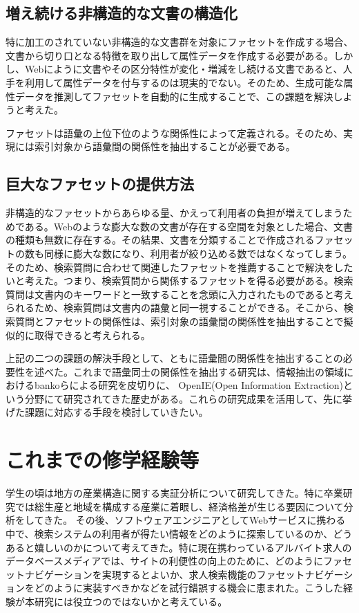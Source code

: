 \documentclass[a4j,10pt, twocolumn]{jarticle}
\begin{document}
\subsection{増え続ける非構造的な文書の構造化}
 特に加工のされていない非構造的な文書群を対象にファセットを作成する場合、文書から切り口となる特徴を取り出して属性データを作成する必要がある。しかし、Webにように文書やその区分特性が変化・増減をし続ける文書であると、人手を利用して属性データを付与するのは現実的でない。そのため、生成可能な属性データを推測してファセットを自動的に生成することで、この課題を解決しようと考えた。

 ファセットは語彙の上位下位のような関係性によって定義される。そのため、実現には索引対象から語彙間の関係性を抽出することが必要である。

\subsection{巨大なファセットの提供方法}
 非構造的なファセットからあらゆる量、かえって利用者の負担が増えてしまうためである。Webのような膨大な数の文書が存在する空間を対象とした場合、文書の種類も無数に存在する。その結果、文書を分類することで作成されるファセットの数も同様に膨大な数になり、利用者が絞り込める数ではなくなってしまう。そのため、検索質問に合わせて関連したファセットを推薦することで解決をしたいと考えた。つまり、検索質問から関係するファセットを得る必要がある。検索質問は文書内のキーワードと一致することを念頭に入力されたものであると考えられるため、検索質問は文書内の語彙と同一視することができる。そこから、検索質問とファセットの関係性は、索引対象の語彙間の関係性を抽出することで擬似的に取得できると考えられる。

上記の二つの課題の解決手段として、ともに語彙間の関係性を抽出することの必要性を述べた。これまで語彙同士の関係性を抽出する研究は、情報抽出の領域におけるbankoらによる研究\cite{banko}を皮切りに、 OpenIE(Open Information Extraction)という分野にて研究されてきた歴史がある\cite{niklaus}。これらの研究成果を活用して、先に挙げた課題に対応する手段を検討していきたい。

\section{これまでの修学経験等}
 学生の頃は地方の産業構造に関する実証分析について研究してきた。特に卒業研究では総生産と地域を構成する産業に着眼し、経済格差が生じる要因について分析をしてきた。
 その後、ソフトウェアエンジニアとしてWebサービスに携わる中で、検索システムの利用者が得たい情報をどのように探索しているのか、どうあると嬉しいのかについて考えてきた。特に現在携わっているアルバイト求人のデータベースメディアでは、サイトの利便性の向上のために、どのようにファセットナビゲーションを実現するとよいか、求人検索機能のファセットナビゲーションをどのように実装すべきかなどを試行錯誤する機会に恵まれた。こうした経験が本研究には役立つのではないかと考えている。
\end{document}
